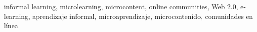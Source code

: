\begin{IEEEkeywords}
	informal learning, microlearning, microcontent, online communities, Web 2.0,
	e-learning, aprendizaje informal, microaprendizaje, microcontenido,
	comunidades en línea
\end{IEEEkeywords}